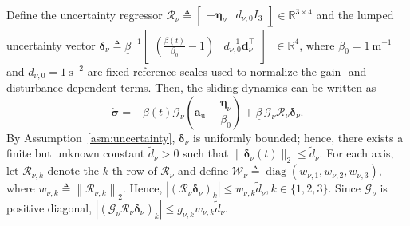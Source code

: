 \documentclass[10pt,conference]{IEEEtran}
\begin{document}
Define the uncertainty regressor $\mathcal R_\nu \triangleq \begin{bmatrix} - \boldsymbol\eta_\nu & d_{\nu,0} I_3 \end{bmatrix} \in\mathbb R^{3\times4}$ and the lumped uncertainty vector $\boldsymbol\delta_\nu \triangleq \underline{\beta}^{-1} \begin{bmatrix} \left(\frac{\beta(t)}{\beta_0} - 1\right) & d_{\nu,0}^{-1} \boldsymbol d_\nu^\top \end{bmatrix}^\top\in\mathbb R^4$, where $\beta_0 = 1~\mathrm{m}^{-1}$ and $d_{\nu,0}=1~\mathrm{s}^{-2}$ are fixed reference scales used to normalize the gain- and disturbance-dependent terms.
Then, the sliding dynamics can be written as
\begin{equation}
    \dot{\boldsymbol\sigma} = -\beta(t)\mathcal G_\nu\left(\boldsymbol a_{\mathrm u} - \frac{\boldsymbol\eta_\nu}{\beta_0} \right) + \underline{\beta}\,\mathcal G_\nu\mathcal R_\nu\boldsymbol\delta_\nu.
    \label{sliding uncertainty dynamics: equation}
\end{equation}
By Assumption~\ref{asm:uncertainty}, $\boldsymbol\delta_\nu$ is uniformly bounded; hence, there exists a finite but unknown constant $\tilde d_\nu>0$ such that $\|\boldsymbol\delta_\nu(t)\|_2\leq\tilde d_\nu$.
For each axis, let $\mathcal R_{\nu,k}$ denote the $k$-th row of $\mathcal R_\nu$ and define $\mathcal W_\nu \triangleq \operatorname{diag} (w_{\nu,1},w_{\nu,2},w_{\nu,3})$, where $w_{\nu,k} \triangleq \left\| \mathcal R_{\nu,k} \right\|_2$.
Hence, $\left| (\mathcal R_\nu\boldsymbol\delta_\nu)_k \right| \leq w_{\nu,k}\tilde d_\nu, k\in\{1,2,3\}$.
Since $\mathcal G_\nu$ is positive diagonal, $\left| (\mathcal G_\nu\mathcal R_\nu\boldsymbol\delta_\nu)_k \right| \le g_{\nu,k}w_{\nu,k}\tilde d_\nu$.
\end{document}

